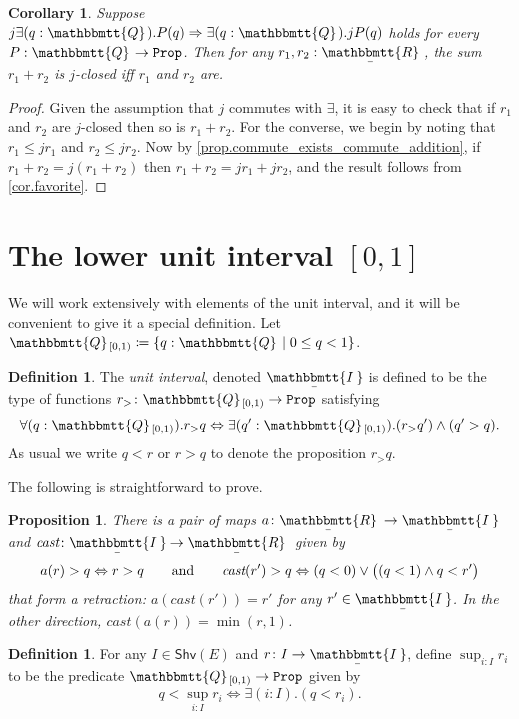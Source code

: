 \documentclass[11pt, oneside, article]{memoir}
\theoremstyle{plain}
\newtheorem{proposition}[theorem]{Proposition}
\newtheorem{corollary}[theorem]{Corollary}
\theoremstyle{definition}
\newtheorem{definition}[theorem]{Definition}
\theoremstyle{remark}
\newcommand{\const}[1]{\mathtt{#1}}
\newcommand{\Fun}[1]{\mathsf{#1}}
\newcommand{\tn}[1]{\textnormal{#1}}
\newcommand{\ubar}[1]{\underaccent{\bar}{#1}}
\newcommand{\internal}[1]{\raisebox{-.03ex}{$\mathbbmtt{#1}$}}
\newcommand{\hs}{\hspace{1.1pt}}
\newcommand{\tqq}{\internal{Q}\hs}
\newcommand{\tqqint}{\internal{Q}\hs_{[0,1)}}
\newcommand{\trr}{\internal{R}\hs}
\newcommand{\tii}{\ubar{\internal{I\hs\hs}}\!\hs}
\newcommand{\tlrr}{\ubar{\trr}\hs}
\newcommand{\cast}{\textit{cast}}
\newcommand{\shv}{\Fun{Shv}}
\newcommand{\prop}{\const{Prop}}
\newcommand{\imp}{\Rightarrow}
\renewcommand{\iff}{\Leftrightarrow}
\newcommand{\qqand}{\qquad\tn{and}\qquad}
\begin{document}
\begin{corollary}\label{cor.closed_sum}
Suppose $j\exists(q:\tqq).P(q)\imp \exists(q:\tqq).jP(q)$ holds for every $P:\tqq\to\prop$. Then for any $r_1,r_2:\tlrr$, the sum $r_1+r_2$ is $j$-closed iff $r_1$ and $r_2$ are.
\end{corollary}
\begin{proof}
Given the assumption that $j$ commutes with $\exists$, it is easy to check that if $r_1$ and $r_2$ are $j$-closed then so is $r_1+r_2$. For the converse, we begin by noting that $r_1\leq jr_1$ and $r_2\leq jr_2$. Now by \cref{prop.commute_exists_commute_addition}, if $r_1+r_2=j(r_1+r_2)$ then $r_1+r_2=jr_1+jr_2$, and the result follows from \cref{cor.favorite}.
\end{proof}

\section{The lower unit interval $[0,1]$}

We will work extensively with elements of the unit interval, and it will be convenient to give it a special definition. Let $\tqqint\coloneqq\{q:\tqq\mid 0\leq q< 1\}$.

\begin{definition}\label{def.unit_interval}
The \emph{unit interval}, denoted $\tii$ is defined to be the type of functions $r_>\colon\tqqint\to\prop$ satisfying
\begin{equation}\label{eqn.down_closed_rounded_for_interval}
	\forall(q:\tqqint).r_>q\iff\exists(q':\tqqint).(r_>q')\wedge (q'>q).
\end{equation}
As usual we write $q<r$ or $r>q$ to denote the proposition $r_>q$.
\end{definition}

The following is straightforward to prove.
\begin{proposition}\label{prop.unit_interval_cast}
There is a pair of maps $a\colon\tlrr\to\tii$ and $\cast\colon\tii\to\tlrr$ given by
\[
a(r)>q\iff r>q
\qqand
\cast(r')>q\iff (q<0)\vee\big((q<1)\wedge q<r'\big)
\]
that form a retraction: $a(\cast(r'))=r'$ for any $r'\in\tii$. In the other direction, $\cast(a(r))=\min(r,1)$.
\end{proposition}

\begin{definition}\label{def.sup_unit_interval}
For any $I\in\shv(E)$ and $r\colon I\to\tii$, define $\sup_{i:I}r_i$ to be the predicate $\tqqint\to\prop$ given by
\[
q<\sup_{i:I}r_i\iff \exists(i:I).(q<r_i).
\]
\end{definition}
\end{document}
